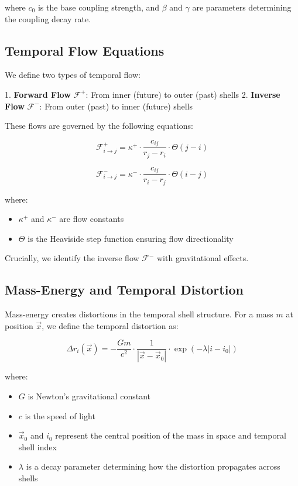 \documentclass[12pt,a4paper]{article}
\begin{document}
where $c_0$ is the base coupling strength, and $\beta$ and $\gamma$ are parameters determining the coupling decay rate.

\subsection{Temporal Flow Equations}

We define two types of temporal flow:

1. \textbf{Forward Flow} $\mathcal{F}^+$: From inner (future) to outer (past) shells
2. \textbf{Inverse Flow} $\mathcal{F}^-$: From outer (past) to inner (future) shells

These flows are governed by the following equations:

\begin{equation}
\mathcal{F}^+_{i \to j} = \kappa^+ \cdot \frac{c_{ij}}{r_j - r_i} \cdot \Theta(j - i)
\end{equation}

\begin{equation}
\mathcal{F}^-_{i \to j} = \kappa^- \cdot \frac{c_{ij}}{r_i - r_j} \cdot \Theta(i - j)
\end{equation}

where:
\begin{itemize}
    \item $\kappa^+$ and $\kappa^-$ are flow constants
    \item $\Theta$ is the Heaviside step function ensuring flow directionality
\end{itemize}

Crucially, we identify the inverse flow $\mathcal{F}^-$ with gravitational effects.

\subsection{Mass-Energy and Temporal Distortion}

Mass-energy creates distortions in the temporal shell structure. For a mass $m$ at position $\vec{x}$, we define the temporal distortion as:

\begin{equation}
\Delta r_i(\vec{x}) = -\frac{G m}{c^2} \cdot \frac{1}{|\vec{x} - \vec{x}_0|} \cdot \exp(-\lambda |i - i_0|)
\end{equation}

where:
\begin{itemize}
    \item $G$ is Newton's gravitational constant
    \item $c$ is the speed of light
    \item $\vec{x}_0$ and $i_0$ represent the central position of the mass in space and temporal shell index
    \item $\lambda$ is a decay parameter determining how the distortion propagates across shells
\end{itemize}
\end{document}
